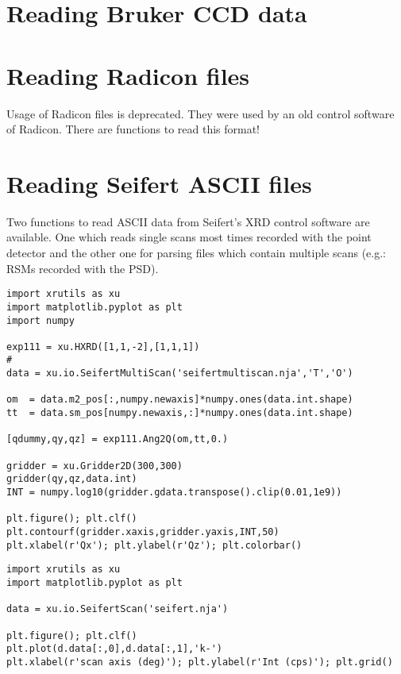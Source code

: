 \section{Reading Bruker CCD data}

\section{Reading Radicon files}

Usage of Radicon files is deprecated. They were used by an old control software of Radicon. There are functions to read this format!

\section{Reading Seifert ASCII files}

Two functions to read ASCII data from Seifert's XRD control software are available. One which reads single scans most times recorded with the point detector and the other one for parsing files which contain multiple scans (e.g.: RSMs recorded with the PSD).

\begin{lstlisting}[caption=script to parse and plot a reciprocal space map recorded with Seifert's XRD control software]
import xrutils as xu
import matplotlib.pyplot as plt
import numpy

exp111 = xu.HXRD([1,1,-2],[1,1,1])
#
data = xu.io.SeifertMultiScan('seifertmultiscan.nja','T','O')

om  = data.m2_pos[:,numpy.newaxis]*numpy.ones(data.int.shape)
tt  = data.sm_pos[numpy.newaxis,:]*numpy.ones(data.int.shape)

[qdummy,qy,qz] = exp111.Ang2Q(om,tt,0.)

gridder = xu.Gridder2D(300,300)
gridder(qy,qz,data.int)
INT = numpy.log10(gridder.gdata.transpose().clip(0.01,1e9))

plt.figure(); plt.clf()
plt.contourf(gridder.xaxis,gridder.yaxis,INT,50)
plt.xlabel(r'Qx'); plt.ylabel(r'Qz'); plt.colorbar()
\end{lstlisting}

\begin{lstlisting}[caption=script to parse and plot a single scan recorded with Seifert's XRD control software]
import xrutils as xu
import matplotlib.pyplot as plt

data = xu.io.SeifertScan('seifert.nja')

plt.figure(); plt.clf()
plt.plot(d.data[:,0],d.data[:,1],'k-')
plt.xlabel(r'scan axis (deg)'); plt.ylabel(r'Int (cps)'); plt.grid()
\end{lstlisting}

